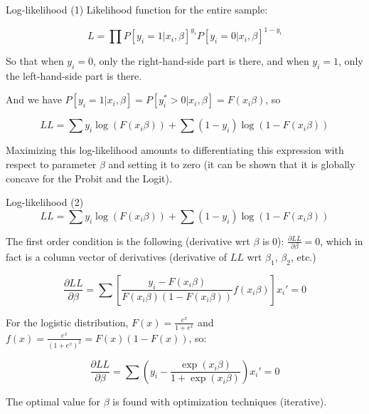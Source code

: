 \documentclass[aspectratio=169]{beamer}
\begin{document}
\begin{frame}{Log-likelihood (1)}
Likelihood function for the entire sample:

\[L = \prod P[y_i = 1|x_i, \beta]^{y_i} P[y_i = 0|x_i, \beta]^{1-y_i}\]

So that when $y_i = 0$, only the right-hand-side part is there, and when $y_i = 1$, only the left-hand-side part is there.

And we have $P[y_i = 1|x_i, \beta] = P[y_i^* > 0|x_i, \beta] = F(x_i\beta)$, so

\[LL = \sum y_i \log(F(x_i\beta)) + \sum(1 - y_i)\log(1 - F(x_i\beta))\]

Maximizing this log-likelihood amounts to differentiating this expression with respect to parameter $\beta$ and setting it to zero (it can be shown that it is globally concave for the Probit and the Logit).
\end{frame}

\begin{frame}{Log-likelihood (2)}
\[LL = \sum y_i \log(F(x_i\beta)) + \sum(1 - y_i)\log(1 - F(x_i\beta))\]

The first order condition is the following (derivative wrt $\beta$ is 0): $\frac{\partial LL}{\partial \beta} = 0$, which in fact is a column vector of derivatives (derivative of $LL$ wrt $\beta_1$, $\beta_2$, etc.)

\[\frac{\partial LL}{\partial \beta} = \sum\left[\frac{y_i - F(x_i\beta)}{F(x_i\beta)(1 - F(x_i\beta))}f(x_i\beta)\right]x_i' = 0\]

For the logistic distribution, $F(x) = \frac{e^x}{1+e^x}$ and $f(x) = \frac{e^x}{(1+e^x)^2} = F(x)(1-F(x))$, so:

\[\frac{\partial LL}{\partial \beta} = \sum\left(y_i - \frac{\exp(x_i\beta)}{1 + \exp(x_i\beta)}\right)x_i' = 0\]

The optimal value for $\beta$ is found with optimization techniques (iterative).
\end{frame}
\end{document}
